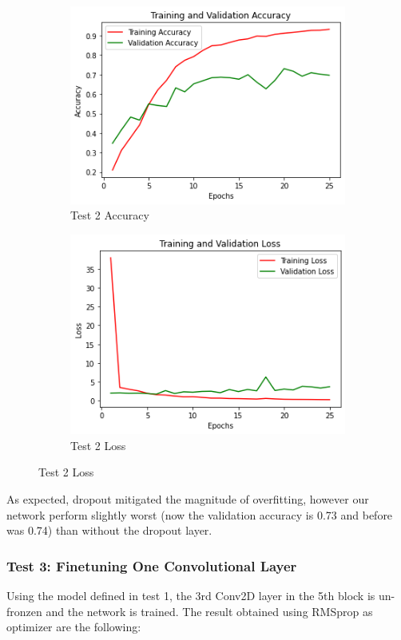 \begin{figure}[H]
	\begin{subfigure}{0.5\textwidth}
		\includegraphics[width=0.9\linewidth]{img/vgg16/vgg16fe2acc.png} 
		\caption{Test 2 Accuracy}
		\label{fig:vgg16fe2acc}
	\end{subfigure}
	\begin{subfigure}{0.5\textwidth}
		\includegraphics[width=0.9\linewidth]{img/vgg16/vgg16fe2loss.png}
		\caption{Test 2 Loss}
		\label{fig:vgg16fe2oss}
	\end{subfigure}
\end{figure}

\noindent As expected, dropout mitigated the magnitude of overfitting, however our network perform slightly worst (now the validation accuracy is 0.73 and before was 0.74) than without the dropout layer.


\subsubsection{Test 3: Finetuning One Convolutional Layer}
Using the model defined in test 1, the 3rd Conv2D layer in the 5th block is un-fronzen and the network is trained. The result obtained using RMSprop as optimizer are the following:

